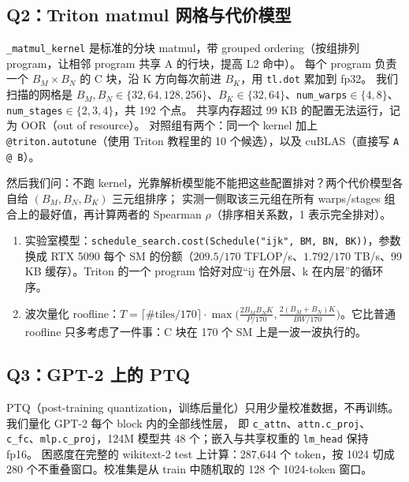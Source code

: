 \documentclass[11pt,a4paper]{ctexart}
\begin{document}
\subsection{Q2：Triton matmul 网格与代价模型}

\texttt{\_matmul\_kernel} 是标准的分块 matmul，带 grouped ordering（按组排列 program，让相邻 program 共享 A 的行块，提高 L2 命中）。
每个 program 负责一个 $B_M\times B_N$ 的 C 块，沿 K 方向每次前进 $B_K$，用 \texttt{tl.dot} 累加到 fp32。
我们扫描的网格是 $B_M,B_N\in\{32,64,128,256\}$、$B_K\in\{32,64\}$、\texttt{num\_warps}$\in\{4,8\}$、\texttt{num\_stages}$\in\{2,3,4\}$，共 192 个点。
共享内存超过 99 KB 的配置无法运行，记为 OOR（out of resource）。
对照组有两个：同一个 kernel 加上 \texttt{@triton.autotune}（使用 Triton 教程里的 10 个候选），以及 cuBLAS（直接写 \texttt{A @ B}）。

然后我们问：不跑 kernel，光靠解析模型能不能把这些配置排对？两个代价模型各自给 $(B_M,B_N,B_K)$ 三元组排序；
实测一侧取该三元组在所有 warps/stages 组合上的最好值，再计算两者的 Spearman $\rho$（排序相关系数，1 表示完全排对）。
\begin{enumerate}
\item 实验室模型：\texttt{schedule\_search.cost(Schedule("ijk", BM, BN, BK))}，参数换成 RTX 5090 每个 SM 的份额（$209.5/170$ TFLOP/s、$1.792/170$ TB/s、99 KB 缓存）。Triton 的一个 program 恰好对应“ij 在外层、k 在内层”的循环序。
\item 波次量化 roofline：$T = \lceil \#\text{tiles}/170\rceil\cdot\max\bigl(\frac{2B_MB_NK}{P/170},\frac{2(B_M+B_N)K}{BW/170}\bigr)$。它比普通 roofline 只多考虑了一件事：C 块在 170 个 SM 上是一波一波执行的。
\end{enumerate}

\subsection{Q3：GPT-2 上的 PTQ}

PTQ（post-training quantization，训练后量化）只用少量校准数据，不再训练。我们量化 GPT-2 每个 block 内的全部线性层，
即 \texttt{c\_attn}、\texttt{attn.c\_proj}、\texttt{c\_fc}、\texttt{mlp.c\_proj}，124M 模型共 48 个；嵌入与共享权重的 \texttt{lm\_head} 保持 fp16。
困惑度在完整的 wikitext-2 test 上计算：287,644 个 token，按 1024 切成 280 个不重叠窗口。校准集是从 train 中随机取的 128 个 1024-token 窗口。
\end{document}
